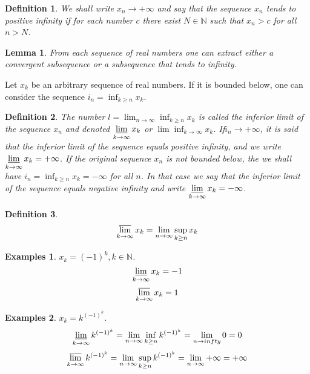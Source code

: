 \documentclass[a4paper,12pt]{article} %
\newtheorem{definition}{Definition}[section]
\newtheorem{lemma}[theorem]{Lemma}
\newtheorem{example}{Examples}
\begin{document}
\begin{definition}
    We shall write $x_n \to +\infty$ and say that the sequence ${x_n}$
    tends to positive infinity if for each number $c$ there exist 
    $N \in \mathbb{N}$ such that $x_n > c$ for all $n > N$.
\end{definition}

\begin{lemma}
    From each sequence of real numbers one can extract either a convergent 
    subsequence or a subsequence that tends to infinity.
\end{lemma}

Let $x_k$ be an arbitrary sequence of real numbers. If it is bounded below,
one can consider the sequence $\displaystyle i_n = \inf_{k\ge n} x_k$.
\begin{definition}
    The number $\displaystyle l = \lim_{n \to \infty} \inf_{k \ge n}x_k$
    is called the inferior limit of the sequence ${x_n}$ and denoted 
    $\displaystyle \varliminf_{k \to \infty} x_k$
    or $\displaystyle \lim \inf_{k \to \infty} x_k$. If$i_n \to +\infty$,
    it is said that the inferior limit of the sequence equals positive 
    infinity, and we write $\displaystyle \varliminf_{k \to \infty} x_k 
    = +\infty$. If the original sequence ${x_n}$ is not bounded below, the we 
    shall have $i_n = \inf_{k \ge n} x_k = -\infty$ for all $n$. In that case 
    we say that the inferior limit of the sequence equals negative 
    infinity and write $\displaystyle \varliminf_{k \to \infty} x_k
    = -\infty$.
\end{definition}

\begin{definition}
    \[\varlimsup_{k \to \infty}x_k = \lim_{n \to \infty}
    \sup_{k \ge n}x_k\]
\end{definition}

\begin{example}
    $x_k = (-1)^k, k \in \mathbb{N}$.
    \[\varliminf_{k \to \infty} x_k = -1\]
    \[\varlimsup_{k \to \infty} x_k = 1\]
\end{example}

\begin{example}
    $\displaystyle x_k = k^{(-1)^k}$.
    \[ \varliminf_{k \to \infty} k^{(-1)^k} = \lim_{n \to \infty} 
    \inf_{k \ge n} k^{(-1)^k}= \lim_{n \to infty} 0 = 0\]
    \[ \varlimsup_{k \to \infty} k^{(-1)^k} = \lim_{n \to \infty} 
    \sup_{k \ge n} k^{(-1)^k}= \lim_{n \to \infty} +\infty = +\infty\]
\end{example}
\end{document}
